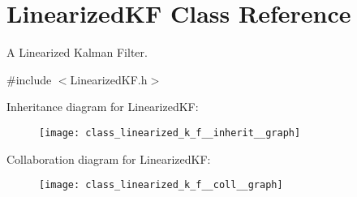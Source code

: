 \hypertarget{class_linearized_k_f}{\section{\-Linearized\-K\-F \-Class \-Reference}
\label{class_linearized_k_f}
}


\-A \-Linearized \-Kalman \-Filter.  




{\ttfamily \#include $<$\-Linearized\-K\-F.\-h$>$}



\-Inheritance diagram for \-Linearized\-K\-F\-:\nopagebreak
\begin{figure}[H]
\begin{center}
\leavevmode
\texttt{[image: class\_linearized\_k\_f\_\_inherit\_\_graph]}
\end{center}
\end{figure}


\-Collaboration diagram for \-Linearized\-K\-F\-:\nopagebreak
\begin{figure}[H]
\begin{center}
\leavevmode
\texttt{[image: class\_linearized\_k\_f\_\_coll\_\_graph]}
\end{center}
\end{figure}

